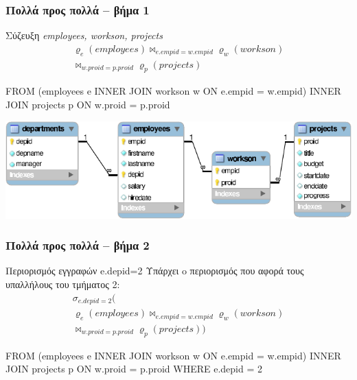 \begin{frame}
\frametitle{Πολλά προς πολλά -- βήμα 1}
\begin{minipage}{\wE}
\vspace{-0.5cm}
\begin{block}{\small Σύζευξη {\en\em employees, workson, projects}}
\[
  \begin{split}
      \varrho_{e} (employees) \bowtie_{e.empid=w.empid} \varrho_{w} (workson)  \\
                              \bowtie_{w.proid=p.proid} \varrho_{p} (projects)
  \end{split}
\]
\vspace*{-1em}
\pause
\en
\begin{SQL}
    FROM (employees e INNER JOIN workson w
                         ON e.empid = w.empid)
                      INNER JOIN projects p
                         ON w.proid = p.proid
\end{SQL}
\el  
\end{block}
\includegraphics[scale=0.9]{../common/companyREL.pdf}
\end{minipage}
\end{frame}


\begin{frame}
\frametitle{Πολλά προς πολλά -- βήμα 2}
\begin{minipage}{\wE}
\vspace{-0.5cm}
\begin{block}{Περιορισμός εγγραφών {\en e.depid=2}}
Υπάρχει o περιορισμός που αφορά τους υπαλλήλους του τμήματος 2:
\[
\begin{split}
    \sigma_{e.depid=2}
    (                           \\
      \varrho_{e} (employees) \bowtie_{e.empid=w.empid} \varrho_{w} (workson)  \\
                              \bowtie_{w.proid=p.proid} \varrho_{p} (projects)
    )
\end{split}
\]
\vspace{-0.5cm}
\pause
\en
\begin{SQL}
    FROM (employees e INNER JOIN workson w
                         ON e.empid = w.empid)
                      INNER JOIN projects p
                         ON w.proid = p.proid
   WHERE e.depid = 2
\end{SQL}
\el
  \end{block}
\end{minipage}
\end{frame}


